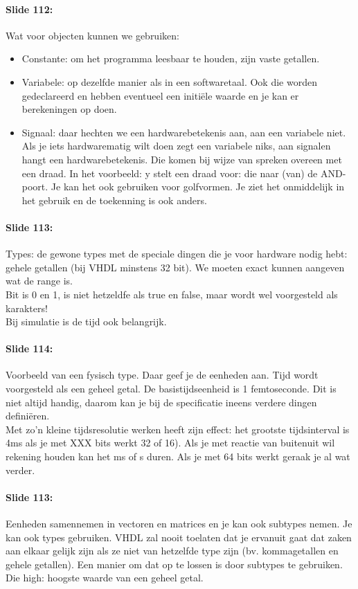 \documentclass[10pt,a4paper]{book}
\begin{document}
\paragraph{Slide 112:} Wat voor objecten kunnen we gebruiken:
\begin{itemize}
\item Constante: om het programma leesbaar te houden, zijn vaste getallen. 	
\item Variabele: op dezelfde manier als in een softwaretaal. Ook die worden gedeclareerd en hebben eventueel een initi\"ele waarde en je kan er berekeningen op doen. 	
\item Signaal: daar hechten we een hardwarebetekenis aan, aan een variabele niet. Als je iets hardwarematig wilt doen zegt een variabele niks, aan signalen hangt een hardwarebetekenis. Die komen bij wijze van spreken overeen met een draad. In het voorbeeld: y stelt een draad voor: die naar (van) de AND-poort. Je kan het ook gebruiken voor golfvormen. Je ziet het onmiddelijk in het gebruik en de toekenning is ook anders. 
\end{itemize}

\paragraph{Slide 113:} Types: de gewone types met de speciale dingen die je voor hardware nodig hebt: gehele getallen (bij VHDL minstens 32 bit). We moeten exact kunnen aangeven wat de range is.\\
Bit is 0 en 1, is niet hetzeldfe als true en false, maar wordt wel voorgesteld als karakters!\\
Bij simulatie is de tijd ook belangrijk.

\paragraph{Slide 114:} Voorbeeld van een fysisch type. Daar geef je de eenheden aan. Tijd wordt voorgesteld als een geheel getal. De basistijdseenheid is 1 femtoseconde. Dit is niet altijd handig, daarom kan je bij de specificatie ineens verdere dingen defini\"eren.\\
Met zo'n kleine tijdsresolutie werken heeft zijn effect: het grootste tijdsinterval is 4ms als je met XXX bits werkt 32 of 16). Als je met reactie van buitenuit wil rekening houden kan het ms of s duren. Als je met 64 bits werkt geraak je al wat verder. 

\paragraph{Slide 113:} Eenheden samennemen in vectoren en matrices en je kan ook subtypes nemen. Je kan ook types gebruiken. VHDL zal nooit toelaten dat je ervanuit gaat dat zaken aan elkaar gelijk zijn als ze niet van hetzelfde type zijn (bv. kommagetallen en gehele getallen). Een manier om dat op te lossen is door subtypes te gebruiken. Die high: hoogste waarde van een geheel getal.
\end{document}
